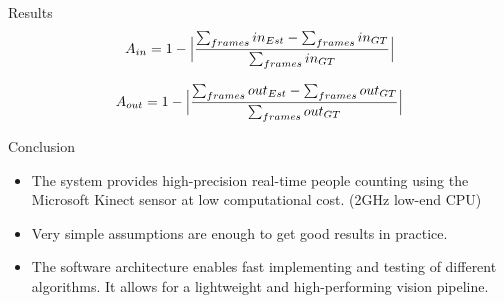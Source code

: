 \documentclass[final,hyperref={pdfpagelabels=false}]{beamer}
\begin{document}
\begin{frame}[t]
\begin{columns}[t]
\begin{column}{.465\textwidth}
\begin{block}{
\vspace*{-0.002\textheight}
Results
}
\begin{equation}
\label{eq:in_accuracy}
A_{in} = 1 - \Big{\lvert} \frac{\sum_{frames}{in_{Est}}-\sum_{frames}{in_{GT}}}{\sum_{frames}in_{GT}} \Big{\rvert}
\end{equation} 

\begin{equation}
\label{eq:out_accuracy}
A_{out} = 1 - \Big{\lvert} \frac{\sum_{frames}{out_{Est}}-\sum_{frames}out_{GT}}{\sum_{frames}out_{GT}} \Big{\rvert}
\end{equation} 



    
\end{block}






\begin{block}{
\vspace*{-0.002\textheight}
Conclusion
}

\begin{itemize}
\item The system provides high-precision real-time people counting using the Microsoft Kinect sensor at low computational cost. (2GHz low-end CPU)
\item Very simple assumptions are enough to get good results in practice.
\item The software architecture enables fast implementing and testing of different algorithms. It allows for a lightweight and high-performing vision pipeline.
\end{itemize}
\vspace*{0.0\textheight} %
\end{block}


\end{column}
\end{columns}
\end{frame}
\end{document}
